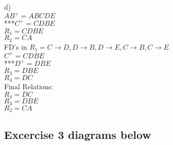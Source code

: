 \documentclass[12pt] {article}
\begin{document}
       	\begin{flushleft}
       	d)\\
       	$AB^{+} = ABCDE$\\
       	***$C^{+} = CDBE$\\
       	$R_{1} = CDBE$\\
       	$R_{2} = CA$\\
       	\medskip
       	FD's in $R_{1} = C \rightarrow D, D \rightarrow B, D \rightarrow E, C \rightarrow B, C \rightarrow E $\\
       	$C^{+} = CDBE$\\
       	***$D^{+} = DBE$\\
       	$R_{3} = DBE$\\
       	$R_{4} = DC$\\

       	Final Relations:\\
       	$R_{4} = DC$\\
       	$R_{3} = DBE$\\
       	$R_{2} = CA$

       	\subsection*{Excercise 3 diagrams below}

       	
       	
       	
       	
       	
       	




       	\end{flushleft}



        
\end{document}
